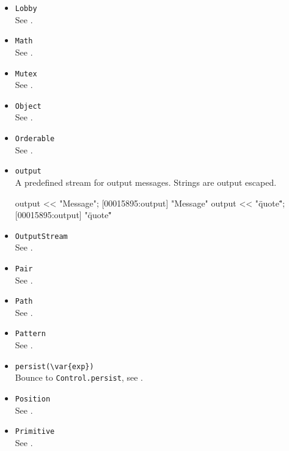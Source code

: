 \begin{itemize}
\item \lstinline|Lobby|\\
  See .

\item \lstinline|Math|\\
  See .

\item \lstinline|Mutex|\\
  See .

\item \lstinline|Object|\\
  See .

\item \lstinline|Orderable|\\
  See .

\item \lstinline|output|\\
  A predefined stream for output messages.  Strings are output
  escaped.
\begin{urbiscript}
output << "Message";
[00015895:output] "Message"
output << "\"quote\"";
[00015895:output] "\"quote\""
\end{urbiscript}

\item \lstinline|OutputStream|\\
  See .

\item \lstinline|Pair|\\
  See .

\item \lstinline|Path|\\
  See .

\item \lstinline|Pattern|\\
  See .

\item \lstinline|persist(\var{exp})|\\
  Bounce to \lstinline|Control.persist|, see .

\item \lstinline|Position|\\
  See .

\item \lstinline|Primitive|\\
  See .


\end{itemize}
